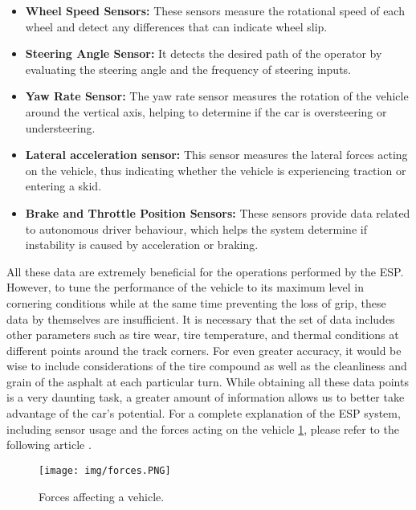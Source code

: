 \documentclass[a4paper,final,12pt]{report}
\begin{document}
\begin{itemize}
    \item \textbf{Wheel Speed Sensors: }These sensors measure the rotational speed of each wheel and detect any differences that can indicate wheel slip.
    \item \textbf{Steering Angle Sensor: }It detects the desired path of the operator by evaluating the steering angle and the frequency of steering inputs.
    \item \textbf{Yaw Rate Sensor: }The yaw rate sensor measures the rotation of the vehicle around the vertical axis, helping to determine if the car is oversteering or understeering.
    \item \textbf{Lateral acceleration sensor: }This sensor measures the lateral forces acting on the vehicle, thus indicating whether the vehicle is experiencing traction or entering a skid.
    \item \textbf{Brake and Throttle Position Sensors: }These sensors provide data related to autonomous driver behaviour, which helps the system determine if instability is caused by acceleration or braking.
\end{itemize}
All these data are extremely beneficial for the operations performed by the ESP. However, to tune the performance of the vehicle to its maximum level in cornering conditions while at the same time preventing the loss of grip, these data by themselves are insufficient. It is necessary that the set of data includes other parameters such as tire wear, tire temperature, and thermal conditions at different points around the track corners. For even greater accuracy, it would be wise to include considerations of the tire compound as well as the cleanliness and grain of the asphalt at each particular turn. While obtaining all these data points is a very daunting task, a greater amount of information allows us to better take advantage of the car's potential.
\noindent For a complete explanation of the ESP system, including sensor usage and the forces acting on the vehicle \ref{figura:forces}, please refer to the following article  \cite{Andersson1017269}.

\begin{figure}[hbtp]
\centering
\texttt{[image: img/forces.PNG]}
\caption{Forces affecting a vehicle.}
\label{figura:forces}
\end{figure}

\newpage
\end{document}
